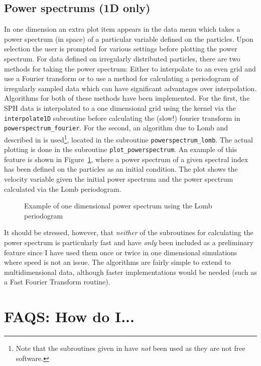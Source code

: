 \documentclass[a4paper,12pt]{article}
\begin{document}
\subsection{Power spectrums (1D only)}
 In one dimension an extra plot item appears
in the data menu which takes a power spectrum (in space) of a particular
variable defined on the particles. Upon selection the user is prompted for
various settings before plotting the power spectrum. For data defined on
irregularly distributed particles, there are two methods for taking the power
spectrum: Either to interpolate to an even grid and use a Fourier
transform or to use a method for calculating a periodogram of
irregularly sampled data which can have significant advantages over
interpolation. Algorithms for both of these methods have been
implemented. For the first, the SPH data is interpolated to a one dimensional
grid using the kernel via the \verb+interpolate1D+ subroutine before calculating the (slow!) fourier
transform in \verb+powerspectrum_fourier+. For the second, an algorithm due to
Lomb and \citet{scargle81} described in \citet{numericalrecipes} is
used\footnote{Note that the subroutines given in \citet{numericalrecipes} have
\emph{not} been used as they are not free software.},
located in the subroutine \verb+powerspectrum_lomb+. The actual plotting is done
in the subroutine \verb+plot_powerspectrum+. An example of this feature is shown
in Figure~\ref{fig:powerspectrum_lomb}, where a power spectrum of a given
spectral index has been defined on the particles as an initial condition. The
plot shows the velocity variable given the initial power spectrum and the power
spectrum calculated via the Lomb periodogram.
\begin{figure}
\centering

\caption{Example of one dimensional power spectrum using the Lomb periodogram}
\label{fig:powerspectrum_lomb}
\end{figure}

 It should be stressed, however, that \emph{neither} of the subroutines for
calculating the power spectrum is particularly fast and have \emph{only} been included as a preliminary feature
since I have used them once or twice in one dimensional simulations where speed
is not an issue. The algorithms are fairly simple to extend to multidimensional
data, although faster implementations would be needed (such as a Fast
Fourier Transform routine).


\section{FAQS: How do I...}
\end{document}
